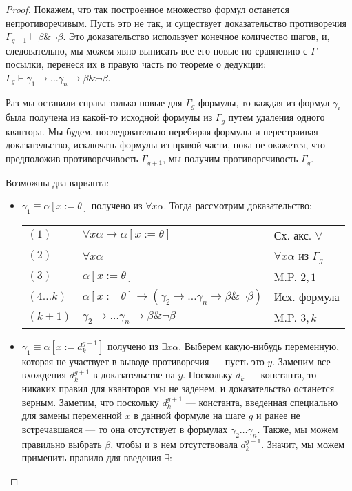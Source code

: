 \begin{proof}
Покажем, что так построенное множество формул останется
непротиворечивым. Пусть это не так, и существует доказательство
противоречия $\Gamma_{g+1} \vdash \beta \& \neg\beta$. Это доказательство
использует конечное количество шагов, и, следовательно, мы можем явно
выписать все его новые по сравнению с $\Gamma$ посылки, 
перенеся их в правую часть по теореме о
дедукции: $\Gamma_g \vdash \gamma_1 \rightarrow \dots \gamma_n \rightarrow \beta \& \neg\beta$.

Раз мы оставили справа только новые для $\Gamma_g$ формулы,
то каждая из формул $\gamma_i$ была получена из какой-то исходной формулы 
из $\Gamma_g$ путем удаления одного квантора. Мы будем, последовательно перебирая
формулы и перестраивая доказательство,
исключать формулы из правой части, пока не окажется, что предположив противоречивость
$\Gamma_{g+1}$, мы получим противоречивость $\Gamma_g$.

Возможны два варианта:
\begin{itemize}
\item $\gamma_1 \equiv \alpha[x := \theta]$ 
получено из $\forall x \alpha$. Тогда рассмотрим доказательство:

\begin{tabular}{lll}
$(1)$ & $\forall x \alpha \rightarrow \alpha [x := \theta]$ & Сх. акс. $\forall$\\
$(2)$ & $\forall x \alpha$ & $\forall x \alpha$ из $\Gamma_g$\\
$(3)$ & $\alpha [x := \theta]$ & M.P. $2,1$\\
$(4 \dots k)$ & $\alpha [x := \theta] \rightarrow (\gamma_2 \rightarrow \dots \gamma_n \rightarrow \beta \& \neg \beta)$ & Исх. формула\\
$(k+1)$ & $\gamma_2 \rightarrow \dots \gamma_n \rightarrow \beta \& \neg \beta$ & M.P. $3,k$
\end{tabular}

\item $\gamma_1 \equiv \alpha[x := d_k^{g+1}]$ получено из $\exists x \alpha$.
Выберем какую-нибудь переменную, которая не участвует в выводе противоречия --- пусть это $y$.
Заменим все вхождения $d_k^{g+1}$ в доказательстве на $y$. Поскольку
$d_k$ --- константа, то никаких правил для кванторов мы не заденем, и доказательство
останется верным.
Заметим, что поскольку $d_k^{g+1}$ --- константа, введенная специально для замены 
переменной $x$ в данной формуле на шаге $g$
и ранее не встречавшаяся --- то она отсутствует в формулах $\gamma_2 \dots \gamma_n$.
Также, мы можем правильно выбрать $\beta$, чтобы и в нем отсутствовала $d_k^{g+1}$.
Значит, мы можем применить правило для введения $\exists$:


\end{itemize}
\end{proof}

